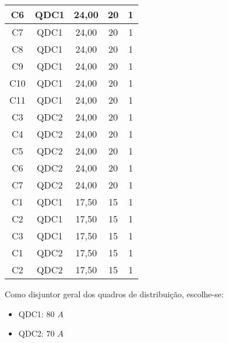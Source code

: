 \begin{longtable}{|c|c|c|c|c|}
	C6                             & QDC1   & 24,00      & 20                 & 1       \\ \hline
	C7                             & QDC1   & 24,00      & 20                 & 1       \\ \hline
	C8                             & QDC1   & 24,00      & 20                 & 1       \\ \hline
	C9                             & QDC1   & 24,00      & 20                 & 1       \\ \hline
	C10                            & QDC1   & 24,00      & 20                 & 1       \\ \hline
	C11                            & QDC1   & 24,00      & 20                 & 1       \\ \hline
	C3                             & QDC2   & 24,00      & 20                 & 1       \\ \hline
	C4                             & QDC2   & 24,00      & 20                 & 1       \\ \hline
	C5                             & QDC2   & 24,00      & 20                 & 1       \\ \hline
	C6                             & QDC2   & 24,00      & 20                 & 1       \\ \hline
	C7                             & QDC2   & 24,00      & 20                 & 1       \\ \hline
	C1                             & QDC1   & 17,50      & 15                 & 1       \\ \hline
	C2                             & QDC1   & 17,50      & 15                 & 1       \\ \hline
	C3                             & QDC1   & 17,50      & 15                 & 1       \\ \hline
	C1                             & QDC2   & 17,50      & 15                 & 1       \\ \hline
	C2                             & QDC2   & 17,50      & 15                 & 1       \\ \hline
\end{longtable}

Como disjuntor geral dos quadros de distribuição, escolhe-se:

\begin{itemize}
	\item QDC1: $80$ $A$
	\item QDC2: $70$ $A$
\end{itemize}

